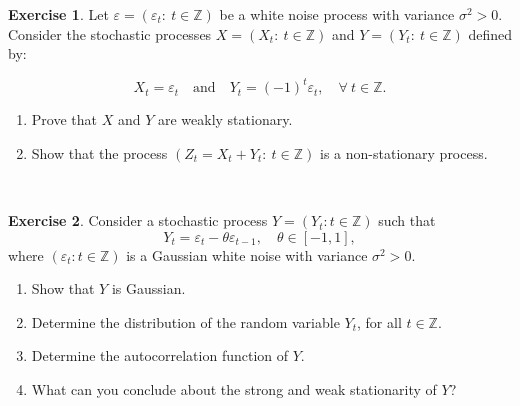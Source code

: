 \documentclass[
  11pt,
  a4paper,
]{book}
\theoremstyle{definition}
\theoremstyle{definition}
\theoremstyle{definition}
\newtheorem{exercise}{Exercise}[chapter]
\theoremstyle{definition}
\theoremstyle{remark}
\begin{document}
\begin{exercise}

Let \(\varepsilon = (\varepsilon_t: ~ t \in \mathbb{Z})\) be a white noise process with variance \(\sigma^2 > 0\). Consider the stochastic processes \(X = (X_t: ~ t \in \mathbb{Z})\) and \(Y = (Y_t: ~ t \in \mathbb{Z})\) defined by:

\[
X_t = \varepsilon_t \quad \text{and} \quad Y_t = (-1)^t \varepsilon_t, \quad \forall ~ t \in \mathbb{Z}.
\]

\begin{enumerate}
\def\labelenumi{(\alph{enumi})}
\item
  Prove that \(X\) and \(Y\) are weakly stationary.
\item
  Show that the process \((Z_t = X_t + Y_t: ~ t \in \mathbb{Z})\) is a non-stationary process.
\end{enumerate}

\end{exercise}

\(\,\)

\begin{exercise}

Consider a stochastic process \(Y = (Y_t: t \in \mathbb{Z})\) such that
\[Y_t = \varepsilon_t - \theta \varepsilon_{t-1}, \quad \theta \in [-1,1],\]
where \((\varepsilon_t: t \in \mathbb{Z})\) is a Gaussian white noise with variance \(\sigma^2 > 0\).

\begin{enumerate}
\def\labelenumi{(\alph{enumi})}
\item
  Show that \(Y\) is Gaussian.
\item
  Determine the distribution of the random variable \(Y_t\), for all \(t \in \mathbb{Z}\).
\item
  Determine the autocorrelation function of \(Y\).
\item
  What can you conclude about the strong and weak stationarity of \(Y\)?
\end{enumerate}

\end{exercise}

\(\,\)
\end{document}
